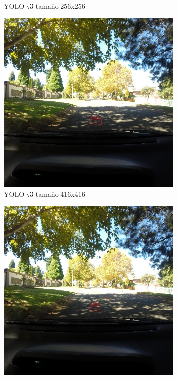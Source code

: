 \begin{figure}[H]
\begin{subfigure}[h]{0.45\linewidth}
		\caption{YOLO v3 tamaño 256x256}
	\end{subfigure}
	\begin{subfigure}[h]{0.45\linewidth}
		\includegraphics[width=\linewidth]{images/results_e_yolo_v3_416.jpg}
		\caption{YOLO v3 tamaño 416x416}
	\end{subfigure}
	\begin{subfigure}[h]{0.45\linewidth}
		\includegraphics[width=\linewidth]{images/results_e_yolo_v3_640.jpg}

\end{subfigure}
\end{figure}
